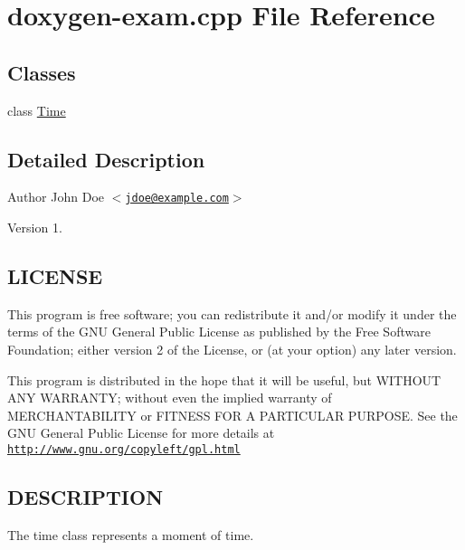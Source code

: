 \hypertarget{doxygen-exam_8cpp}{\section{doxygen-\/exam.cpp \-File \-Reference}
\label{doxygen-exam_8cpp}
}
\subsection*{\-Classes}
\begin{DoxyCompactItemize}
\item 
class \hyperlink{classTime}{\-Time}
\end{DoxyCompactItemize}


\subsection{\-Detailed \-Description}
\begin{DoxyAuthor}{\-Author}
\-John \-Doe $<$\href{mailto:jdoe@example.com}{\tt jdoe@example.\-com}$>$ 
\end{DoxyAuthor}
\begin{DoxyVersion}{\-Version}
1.
\end{DoxyVersion}
\hypertarget{doxygen-exam_8cpp_LICENSE}{}\subsection{\-L\-I\-C\-E\-N\-S\-E}\label{doxygen-exam_8cpp_LICENSE}
\-This program is free software; you can redistribute it and/or modify it under the terms of the \-G\-N\-U \-General \-Public \-License as published by the \-Free \-Software \-Foundation; either version 2 of the \-License, or (at your option) any later version.

\-This program is distributed in the hope that it will be useful, but \-W\-I\-T\-H\-O\-U\-T \-A\-N\-Y \-W\-A\-R\-R\-A\-N\-T\-Y; without even the implied warranty of \-M\-E\-R\-C\-H\-A\-N\-T\-A\-B\-I\-L\-I\-T\-Y or \-F\-I\-T\-N\-E\-S\-S \-F\-O\-R \-A \-P\-A\-R\-T\-I\-C\-U\-L\-A\-R \-P\-U\-R\-P\-O\-S\-E. \-See the \-G\-N\-U \-General \-Public \-License for more details at \href{http://www.gnu.org/copyleft/gpl.html}{\tt http\-://www.\-gnu.\-org/copyleft/gpl.\-html}\hypertarget{doxygen-exam_8cpp_DESCRIPTION}{}\subsection{\-D\-E\-S\-C\-R\-I\-P\-T\-I\-O\-N}\label{doxygen-exam_8cpp_DESCRIPTION}
\-The time class represents a moment of time. 